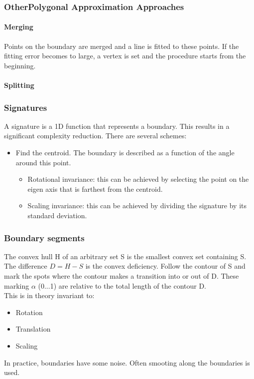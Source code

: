 \subsubsection{OtherPolygonal Approximation Approaches}
\paragraph{Merging}
Points on the boundary are merged and a line is fitted to these points. If the fitting error becomes to large, a vertex is set and the procedure starts from the beginning.\\
\paragraph{Splitting}
\subsubsection{Signatures}
A signature is a 1D function that represents a boundary. This results in a significant complexity reduction. There are several schemes:\\
\begin{itemize}
\item Find the centroid. The boundary is described as a function of the angle around this point.
\begin{itemize}
\item Rotational invariance: this can be achieved by selecting the point on the eigen axis that is farthest from the centroid.
\item Scaling invariance: this can be achieved by dividing the signature by its standard deviation.
\end{itemize}
\end{itemize}
\subsubsection{Boundary segments}
The convex hull H of an arbitrary set S is the smallest convex set containing S. The difference $D=H-S$ is the convex deficiency. Follow the contour of S and mark the spots where the contour makes a transition into or out of D. These marking $\alpha$ (0...1) are relative to the total length of the contour D.\\
This is in theory invariant to:\\
\begin{itemize}
\item Rotation
\item Translation
\item Scaling
\end{itemize}
In practice, boundaries have some noise. Often smooting along the boundaries is used.\\
